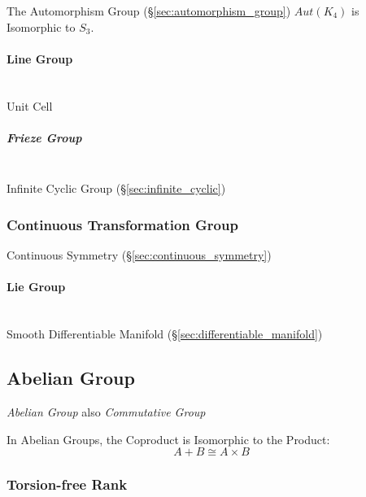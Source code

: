 The Automorphism Group (\S\ref{sec:automorphism_group}) $Aut(K_4)$ is
Isomorphic to $S_3$.



\paragraph{Line Group}\label{sec:line_group}
\hfill \\

Unit Cell



\subparagraph{Frieze Group}\label{sec:frieze_group}
\hfill \\

Infinite Cyclic Group (\S\ref{sec:infinite_cyclic})



\subsubsection{Continuous Transformation Group}
\label{sec:continuous_transformation_group}

Continuous Symmetry (\S\ref{sec:continuous_symmetry})



\paragraph{Lie Group}\label{sec:lie_group}
\hfill \\

Smooth Differentiable Manifold (\S\ref{sec:differentiable_manifold})



\subsection{Abelian Group}\label{sec:abelian_group}

\emph{Abelian Group} also \emph{Commutative Group}

In Abelian Groups, the Coproduct is Isomorphic to the Product:
\[
  A + B \cong A \times B
\]



\subsubsection{Torsion-free Rank}\label{sec:torsionfree_rank}

